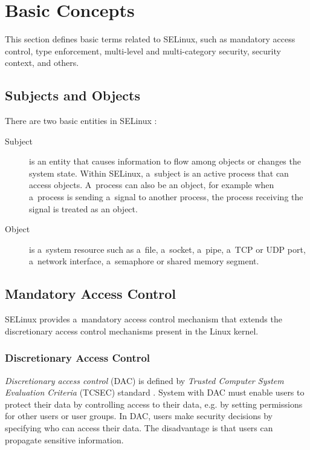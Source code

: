 \section{Basic Concepts}

This section defines basic terms related to SELinux, such as mandatory access
control, type enforcement, multi-level and multi-category security, security
context, and others.

\subsection{Subjects and Objects}
There are two basic entities in SELinux \cite[p.~29]{tsn}:
\begin{description}
    \item [Subject] is an entity that causes information to flow among objects
        or changes the system state. Within SELinux, a~subject is an active
        process that can access objects. A~process can also be an object, for
        example when a~process is sending a~signal to another process, the
        process receiving the signal is treated as an object.
    \item [Object] is a~system resource such as a~file, a~socket, a~pipe, a~TCP
        or UDP port, a~network interface, a~semaphore or shared memory segment.
\end{description}

\subsection{Mandatory Access Control}

SELinux provides a~mandatory access control mechanism that extends the
discretionary access control mechanisms present in the Linux kernel.

\subsubsection{Discretionary Access Control}
\emph{Discretionary access control} (DAC) is defined by \emph{Trusted Computer
System Evaluation Criteria} (TCSEC) standard \cite{orangebook}. System with DAC
must enable users to protect their data by controlling access to their data,
e.g. by setting permissions for other users or user groups. In DAC, users make
security decisions by specifying who can access their data. The disadvantage is
that users can propagate sensitive information.

